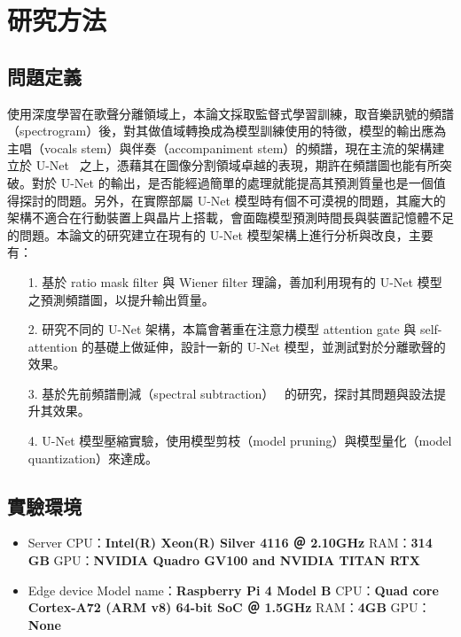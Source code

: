 \chapter{研究方法}
\section{問題定義}
使用深度學習在歌聲分離領域上，本論文採取監督式學習訓練，取音樂訊號的頻譜（spectrogram）後，對其做值域轉換成為模型訓練使用的特徵，模型的輸出應為主唱（vocals stem）與伴奏（accompaniment stem）的頻譜，現在主流的架構建立於 U-Net~\cite{ronneberger2015u,jansson2017singing,hennequin2020spleeter,defossez2019music} 之上，憑藉其在圖像分割領域卓越的表現，期許在頻譜圖也能有所突破。對於 U-Net 的輸出，是否能經過簡單的處理就能提高其預測質量也是一個值得探討的問題。另外，在實際部屬 U-Net 模型時有個不可漠視的問題，其龐大的架構不適合在行動裝置上與晶片上搭載，會面臨模型預測時間長與裝置記憶體不足的問題。本論文的研究建立在現有的 U-Net 模型架構上進行分析與改良，主要有：
\begin{itemize}
	\item[1.] 基於 ratio mask filter 與 Wiener filter 理論，善加利用現有的 U-Net 模型之預測頻譜圖，以提升輸出質量。
	\item[2.] 研究不同的 U-Net 架構，本篇會著重在注意力模型 attention gate 與 self-attention 的基礎上做延伸，設計一新的 U-Net 模型，並測試對於分離歌聲的效果。
	\item[3.] 基於先前頻譜刪減（spectral subtraction）~\cite{boll1979suppression} 的研究，探討其問題與設法提升其效果。
	\item[4.] U-Net 模型壓縮實驗，使用模型剪枝（model pruning）與模型量化（model quantization）來達成。
\end{itemize}

\section{實驗環境}
\begin{itemize}
    \item Server
    \subitem CPU：{\bf Intel(R) Xeon(R) Silver 4116 ＠ 2.10GHz}
    \subitem RAM：{\bf 314 GB}
    \subitem GPU：{\bf NVIDIA Quadro GV100 and NVIDIA TITAN RTX}
    \item Edge device
    \subitem Model name：{\bf Raspberry Pi 4 Model B}
    \subitem CPU：{\bf Quad core Cortex-A72 (ARM v8) 64-bit SoC ＠ 1.5GHz}
    \subitem RAM：{\bf 4GB}
    \subitem GPU：{\bf None}
\end{itemize}


